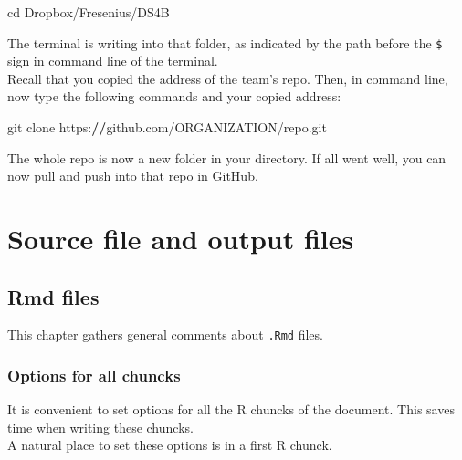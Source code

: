 \documentclass[]{book}
\newenvironment{Shaded}{}{}
\newcommand{\DataTypeTok}[1]{\textcolor[rgb]{0.56,0.13,0.00}{#1}}
\newcommand{\ErrorTok}[1]{\textcolor[rgb]{1.00,0.00,0.00}{\textbf{#1}}}
\newcommand{\KeywordTok}[1]{\textcolor[rgb]{0.00,0.44,0.13}{\textbf{#1}}}
\newcommand{\NormalTok}[1]{#1}
\newcommand{\OperatorTok}[1]{\textcolor[rgb]{0.40,0.40,0.40}{#1}}
\newcommand{\OtherTok}[1]{\textcolor[rgb]{0.00,0.44,0.13}{#1}}
\theoremstyle{definition}
\theoremstyle{definition}
\theoremstyle{definition}
\theoremstyle{remark}
\begin{document}
\begin{Shaded}
\begin{Highlighting}[]
\NormalTok{cd Dropbox}\OperatorTok{/}\NormalTok{Fresenius}\OperatorTok{/}\NormalTok{DS4B }
\end{Highlighting}
\end{Shaded}

The terminal is writing into that folder, as indicated by the path
before the \texttt{\$} sign in command line of the terminal.\\
Recall that you copied the address of the team's repo. Then, in command
line, now type the following commands and your copied address:

\begin{Shaded}
\begin{Highlighting}[]
\NormalTok{git clone https}\OperatorTok{:}\ErrorTok{//}\NormalTok{github.com}\OperatorTok{/}\NormalTok{ORGANIZATION}\OperatorTok{/}\NormalTok{repo.git }
\end{Highlighting}
\end{Shaded}

The whole repo is now a new folder in your directory. If all went well,
you can now pull and push into that repo in GitHub.

\hypertarget{part-source-file-and-output-files}{%
\part{Source file and output
files}\label{part-source-file-and-output-files}}

\hypertarget{rmd}{%
\chapter{Rmd files}\label{rmd}}

This chapter gathers general comments about \texttt{.Rmd} files.

\hypertarget{options-for-all-chuncks}{%
\section{Options for all chuncks}\label{options-for-all-chuncks}}

It is convenient to set options for all the R chuncks of the document.
This saves time when writing these chuncks.\\
A natural place to set these options is in a first R chunck.

\begin{Shaded}
\end{Shaded}
\end{document}
